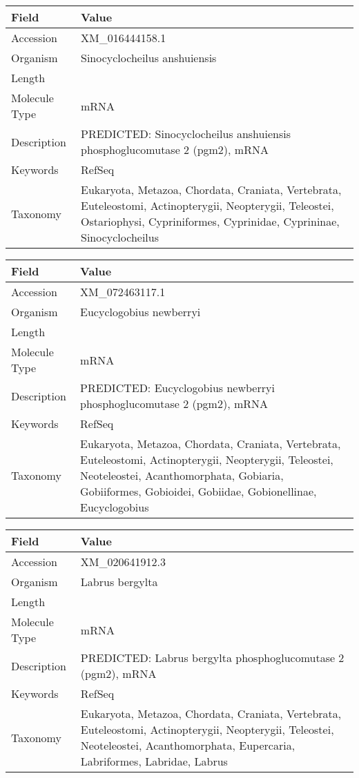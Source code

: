 \documentclass[10pt]{article}
\begin{document}
{\footnotesize
\begin{longtable}{>{\raggedright\arraybackslash}p{4.5cm} >{\raggedright\arraybackslash}p{11.5cm}}
\textbf{Field} & \textbf{Value} \\
\hline
Accession & XM\_016444158.1 \\
Organism & Sinocyclocheilus anshuiensis \\
Length & 3099 \\
Molecule Type & mRNA \\
Description & PREDICTED: Sinocyclocheilus anshuiensis phosphoglucomutase 2 (pgm2), mRNA \\
Keywords & RefSeq \\
Taxonomy & Eukaryota, Metazoa, Chordata, Craniata, Vertebrata, Euteleostomi, Actinopterygii, Neopterygii, Teleostei, Ostariophysi, Cypriniformes, Cyprinidae, Cyprininae, Sinocyclocheilus \\
\end{longtable}
}

{\footnotesize
\begin{longtable}{>{\raggedright\arraybackslash}p{4.5cm} >{\raggedright\arraybackslash}p{11.5cm}}
\textbf{Field} & \textbf{Value} \\
\hline
Accession & XM\_072463117.1 \\
Organism & Eucyclogobius newberryi \\
Length & 1889 \\
Molecule Type & mRNA \\
Description & PREDICTED: Eucyclogobius newberryi phosphoglucomutase 2 (pgm2), mRNA \\
Keywords & RefSeq \\
Taxonomy & Eukaryota, Metazoa, Chordata, Craniata, Vertebrata, Euteleostomi, Actinopterygii, Neopterygii, Teleostei, Neoteleostei, Acanthomorphata, Gobiaria, Gobiiformes, Gobioidei, Gobiidae, Gobionellinae, Eucyclogobius \\
\end{longtable}
}

{\footnotesize
\begin{longtable}{>{\raggedright\arraybackslash}p{4.5cm} >{\raggedright\arraybackslash}p{11.5cm}}
\textbf{Field} & \textbf{Value} \\
\hline
Accession & XM\_020641912.3 \\
Organism & Labrus bergylta \\
Length & 2924 \\
Molecule Type & mRNA \\
Description & PREDICTED: Labrus bergylta phosphoglucomutase 2 (pgm2), mRNA \\
Keywords & RefSeq \\
Taxonomy & Eukaryota, Metazoa, Chordata, Craniata, Vertebrata, Euteleostomi, Actinopterygii, Neopterygii, Teleostei, Neoteleostei, Acanthomorphata, Eupercaria, Labriformes, Labridae, Labrus \\
\end{longtable}
}
\end{document}
